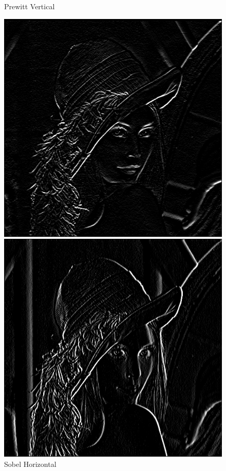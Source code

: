 \documentclass[11pt]{article}
\begin{document}
\begin{figure}[H]
\begin{minipage}[c]{.46\linewidth}
			\caption{Prewitt Vertical}
			\label{fig:PrewittVertical}
		\end{minipage}
		\begin{minipage}[c]{.46\linewidth}
			\centering
			\includegraphics[scale=0.25]{Image/filtreSobelHorizontal.png}
			\caption{Sobel Horizontal}
			\label{fig:SobelHorizontal}
		\end{minipage} \hfill
		\begin{minipage}[c]{.46\linewidth}
		\centering
			\includegraphics[scale=0.25]{Image/filtreSobelVertical.png}

\end{minipage}
\end{figure}
\end{document}
